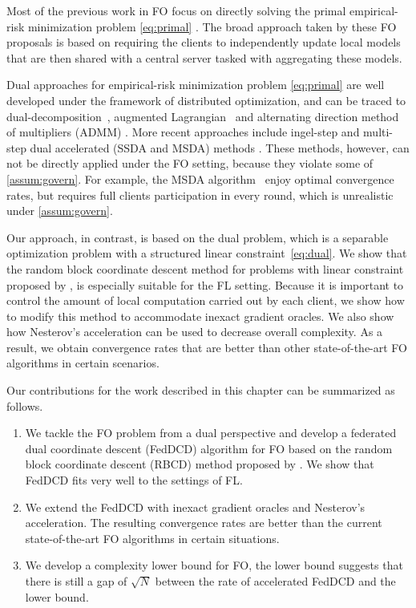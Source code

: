Most of the previous work in FO focus on directly solving the primal empirical-risk minimization problem \eqref{eq:primal}
\citep{mcmahan2017communication,li2018federated,yuan2021federated,karimireddy2020mime}. The broad approach taken by these FO proposals is based on requiring the clients to independently update local models that are then shared with a central server tasked with aggregating these models. 

Dual approaches for empirical-risk minimization problem \eqref{eq:primal} are well developed under the framework of distributed optimization, and can be traced to dual-decomposition~\citep{zeng2008fast,joachims1999making}, augmented Lagrangian~ \citep{jakovetic2014linear} and alternating direction method of multipliers (ADMM) \citep{boyd2011distributed,wei2012distributed}. More recent approaches include ingel-step and multi-step dual accelerated (SSDA and MSDA) methods \citep{Scaman2017OptimalAF}. These methods, however, can not be directly applied under the FO setting, because they violate some of \autoref{assum:govern}. For example, the MSDA algorithm~\citep{Scaman2017OptimalAF} enjoy optimal convergence rates, but requires full clients participation in every round, which is unrealistic under \autoref{assum:govern}. 

Our approach, in contrast, is based on the dual problem, which is a separable optimization problem with a structured linear constraint~\eqref{eq:dual}. We show that the random block coordinate descent method for problems with linear constraint proposed by \citet{necoara2017random}, is especially suitable for the FL setting. Because it is important to control the amount of local computation carried out by each client, we show how to modify this method to accommodate inexact gradient oracles. We also show how Nesterov's acceleration can be used to decrease overall complexity. As a result, we obtain convergence rates that are better than other state-of-the-art FO algorithms in certain scenarios. 


Our contributions for the work described in this chapter can be summarized as follows. 
\begin{enumerate}
    \item We tackle the FO problem from a dual perspective and develop a federated dual coordinate descent (FedDCD) algorithm for FO based on the random block coordinate descent (RBCD) method proposed by \citet{necoara2017random}. We show that FedDCD fits very well to the settings of FL. 
    \item We extend the FedDCD with inexact gradient oracles and Nesterov's acceleration. The resulting convergence rates are better than the current state-of-the-art FO algorithms in certain situations.
    \item We develop a complexity lower bound for FO, the lower bound suggests that there is still a gap of $\sqrt{N}$ between the rate of accelerated FedDCD and the lower bound.
\end{enumerate}

